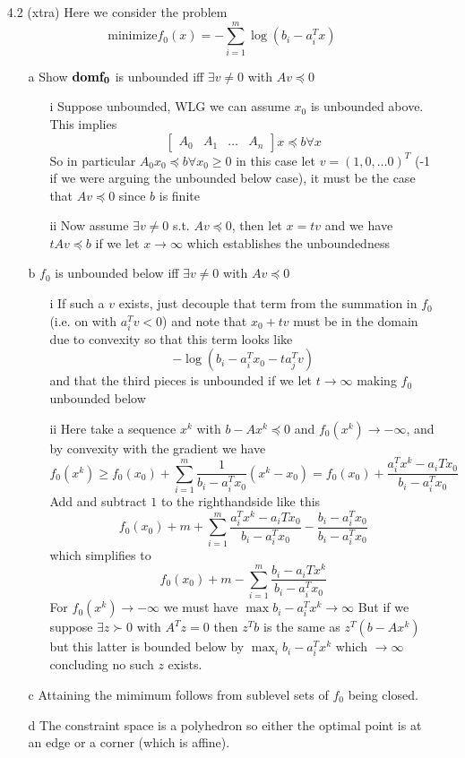 \documentclass[12pt]{article}
\begin{document}
\begin{itemize}
\item[4.2 (xtra)] Here we consider the problem
  $$\text{minimize} f_0(x) = - \sum_{i=1}^m \log (b_i - a_i^T x)$$
  \begin{itemize}
  \item[a] Show $\bf{dom} f_0$ is unbounded iff $\exists v \neq 0$ with $Av \preceq 0$
    \begin{itemize}
    \item[i] Suppose unbounded, WLG we can assume $x_0$ is unbounded above. This implies
      $$\begin{bmatrix}
        A_0 & A_1 & \ldots & A_n
      \end{bmatrix} x \preceq b \forall x$$
      So in particular $A_0 x_0 \preceq b \forall x_0 \geq 0$  in this case let $v = (1, 0, \ldots 0)^T$ (-1 if we were arguing the unbounded below case), it must be the case that $Av \preceq 0$ since $b$ is finite
    \item[ii] Now assume $\exists v \neq 0$ s.t. $Av \preceq 0$, then let $x = tv$ and we have $t Av \preceq b$ if we let $x \rightarrow \infty$ which establishes the unboundedness 
    \end{itemize}
  \item[b] $f_0$ is unbounded below iff $\exists v \neq 0$ with $Av \preceq 0$
    \begin{itemize}
    \item[i] If such a $v$ exists, just decouple that term from the summation in $f_0$ (i.e. on with $a_i^Tv < 0$) and note that $x_0 + tv$ must be in the domain due to convexity so that this term looks like
      $$-\log (b_i - a_i^T x_0 -ta_j^Tv)$$
      and that the third pieces is unbounded if we let $t \rightarrow \infty$ making $f_0$ unbounded below
    \item[ii] Here take a sequence $x^k$ with $b - Ax^k \preceq 0$ and $f_0(x^k) \rightarrow - \infty$, and by convexity with the gradient we have
      $$f_0(x^k) \geq f_0(x_0) + \sum_{i=1}^m \frac{1}{b_i - a_i^Tx_0} (x^k - x_0) = f_0(x_0) + \frac{a_i^Tx^k - a_iTx_0}{b_i - a_i^Tx_0}$$
      Add and subtract $1$ to the righthandside like this
      $$f_0(x_0) + m + \sum_{i=1}^m  \frac{a_i^Tx^k - a_iTx_0}{b_i - a_i^Tx_0} - \frac{b_i - a_i^Tx_0}{b_i - a_i^Tx_0}$$
      which simplifies to
      $$f_0(x_0) + m - \sum_{i=1}^m  \frac{b_i - a_iTx^k}{b_i - a_i^Tx_0}$$
      For $f_0(x^k) \rightarrow -\infty$ we must have $\max b_i - a_i^T x^k \rightarrow \infty$
      But if we suppose $\exists z \succ 0$ with $A^Tz = 0$ then $z^Tb$ is the same as $z^T(b - Ax^k)$ but this latter is bounded below by $\max_i b_i - a_i^Tx^k$ which $\rightarrow \infty$
      concluding no such $z$ exists.
    \end{itemize}
  \item[c] Attaining the mimimum follows from sublevel sets of $f_0$ being closed.
  \item[d] The constraint space is a polyhedron so either the optimal point is at an edge or a corner (which is affine).
  \end{itemize}


\end{itemize}
\end{document}
